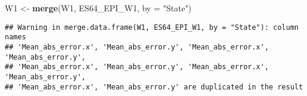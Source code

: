\documentclass[
]{article}
\newenvironment{Shaded}{\begin{snugshade}}{\end{snugshade}}
\newcommand{\AttributeTok}[1]{\textcolor[rgb]{0.13,0.29,0.53}{#1}}
\newcommand{\FunctionTok}[1]{\textcolor[rgb]{0.13,0.29,0.53}{\textbf{#1}}}
\newcommand{\NormalTok}[1]{#1}
\newcommand{\OtherTok}[1]{\textcolor[rgb]{0.56,0.35,0.01}{#1}}
\newcommand{\StringTok}[1]{\textcolor[rgb]{0.31,0.60,0.02}{#1}}
\begin{document}
\begin{Shaded}
\begin{Highlighting}[]
\NormalTok{W1 }\OtherTok{\textless{}{-}} \FunctionTok{merge}\NormalTok{(W1, ES64\_EPI\_W1, }\AttributeTok{by =} \StringTok{"State"}\NormalTok{)}
\end{Highlighting}
\end{Shaded}

\begin{verbatim}
## Warning in merge.data.frame(W1, ES64_EPI_W1, by = "State"): column names
## 'Mean_abs_error.x', 'Mean_abs_error.y', 'Mean_abs_error.x', 'Mean_abs_error.y',
## 'Mean_abs_error.x', 'Mean_abs_error.y', 'Mean_abs_error.x', 'Mean_abs_error.y',
## 'Mean_abs_error.x', 'Mean_abs_error.y' are duplicated in the result
\end{verbatim}
\end{document}

